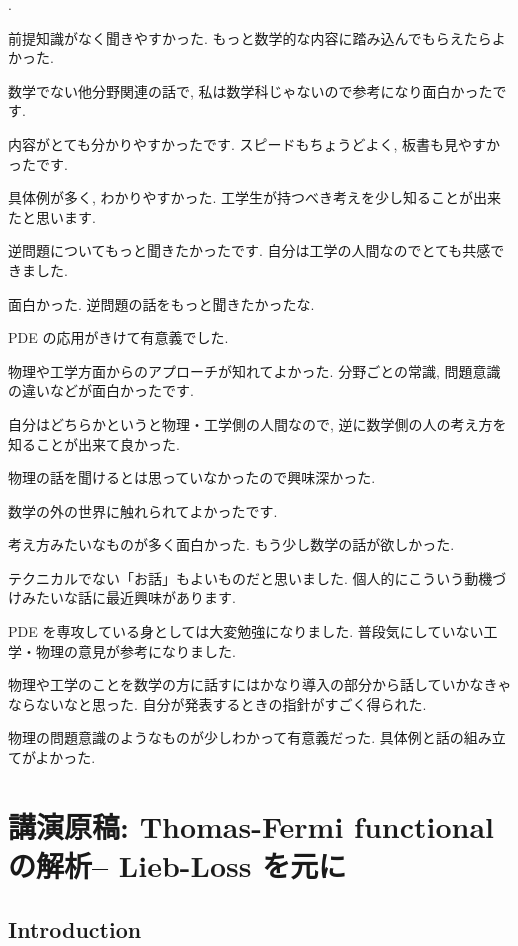 \documentclass[openany, a4paper, oneside]{jsbook}
\newcounter{enum2}
\renewenvironment{enumerate}{%
\begin{list}%
{%
\arabic{enum2}.\ \,%
}%
{%
\usecounter{enum2}
\setlength{\itemindent}{0pt}%
\setlength{\leftmargin}{15pt}%
\setlength{\rightmargin}{0pt}%
\setlength{\labelsep}{0pt}%
\setlength{\labelwidth}{6pt}%
\setlength{\itemsep}{0pt}%
\setlength{\parsep}{0pt}%
\setlength{\listparindent}{0pt}%
}
}{%
\end{list}%
}
\theoremstyle{break}
\theoremstyle{breakdefn}
\begin{document}
\begin{enumerate}
\item 前提知識がなく聞きやすかった.
   もっと数学的な内容に踏み込んでもらえたらよかった.
\item 数学でない他分野関連の話で, 私は数学科じゃないので参考になり面白かったです.
\item 内容がとても分かりやすかったです.
   スピードもちょうどよく, 板書も見やすかったです.
\item 具体例が多く, わかりやすかった.
   工学生が持つべき考えを少し知ることが出来たと思います.
\item 逆問題についてもっと聞きたかったです. 自分は工学の人間なのでとても共感できました.
\item 面白かった. 逆問題の話をもっと聞きたかったな.
\item PDE の応用がきけて有意義でした.
\item 物理や工学方面からのアプローチが知れてよかった.
   分野ごとの常識, 問題意識の違いなどが面白かったです.
\item 自分はどちらかというと物理・工学側の人間なので, 逆に数学側の人の考え方を知ることが出来て良かった.
\item 物理の話を聞けるとは思っていなかったので興味深かった.
\item 数学の外の世界に触れられてよかったです.
\item 考え方みたいなものが多く面白かった. もう少し数学の話が欲しかった.
\item テクニカルでない「お話」もよいものだと思いました. 個人的にこういう動機づけみたいな話に最近興味があります.
\item PDE を専攻している身としては大変勉強になりました.
    普段気にしていない工学・物理の意見が参考になりました.
\item 物理や工学のことを数学の方に話すにはかなり導入の部分から話していかなきゃならないなと思った.
    自分が発表するときの指針がすごく得られた.
\item 物理の問題意識のようなものが少しわかって有意義だった.
    具体例と話の組み立てがよかった.
\end{enumerate}
\chapter{講演原稿: Thomas-Fermi functional の解析-- Lieb-Loss \cite{LiebLoss1} を元に}

\section{Introduction}
\end{document}
